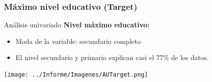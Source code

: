\documentclass[pdf]{beamer}
\begin{document}
{%


           
           
           
 

           
           
           
           
    \subsubsection{Máximo nivel educativo (Target)}
    
\begin{frame}{Análisis univariado}
    \textbf{Nivel máximo educativo:}     
    \begin{itemize}
        \item Moda de la variable: secundario completo
        \item El nivel secundario y primario explican casi el 77\% de los datos.
    \end{itemize}    
    \begin{center}
        \texttt{[image: ../Informe/Imagenes/AUTarget.png]}    
    \end{center}


\end{frame}}
\end{document}

